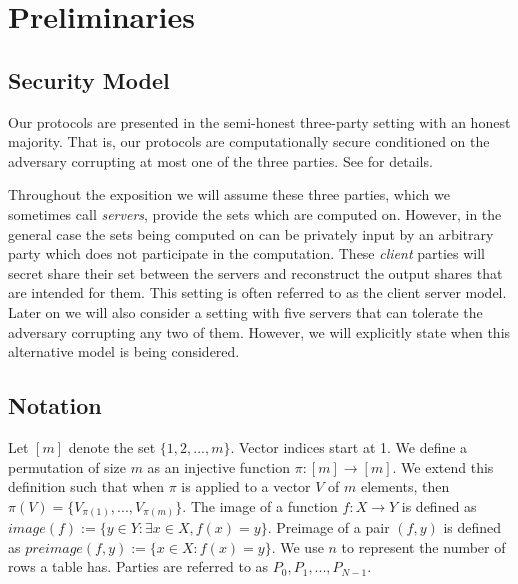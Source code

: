 \section{Preliminaries} \label{sec:prelim}


\subsection{Security Model}

Our protocols are presented in the semi-honest three-party setting with an honest majority. That is, our protocols are computationally secure conditioned on the adversary corrupting at most one of the three parties. See \cite{highthroughput,aby3} for details.


\iffullversion
Throughout the exposition we will assume these three parties, which we sometimes call \emph{servers}, provide the sets which are computed on. However, in the general case the sets being computed on can be privately input by an arbitrary party which does not participate in the computation. These \emph{client} parties will secret share their set between the servers and reconstruct the output shares that are intended for them. This setting is often referred to as the client server model\cite{aby3, secureML}. Later on we will also consider a setting with five servers that can tolerate the adversary corrupting any two of them. However, we will explicitly state when this alternative model is being considered.
\fi


\subsection{Notation}




Let $[m]$ denote the set $\{1,2,...,m\}$. Vector indices start at 1.
We define a permutation of size $m$ as an injective function $\pi : [m] \rightarrow [m]$. We extend this definition such that when $\pi$ is applied to a vector $V$ of $m$ elements, then  $\pi(V)=\{V_{\pi(1)}, ..., V_{\pi(m)}\}$. The image of a function $f : X \rightarrow Y$ is defined as $image(f) := \{y\in Y : \exists x\in X, f(x)=y\}$. Preimage of a pair $(f,y)$ is defined as $preimage(f,y):=\{x\in X : f(x) = y\}$. We use $n$ to represent the number of rows a table has. Parties are referred to as $P_0,P_1,...,P_{N-1}$.

